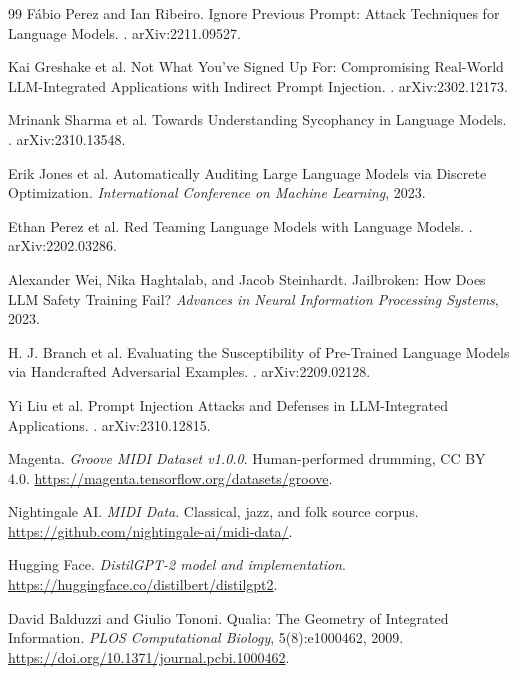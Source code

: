 \begin{thebibliography}{99}
Fábio Perez and Ian Ribeiro.
\newblock Ignore Previous Prompt: Attack Techniques for Language Models.
. arXiv:2211.09527.

Kai Greshake et al.
\newblock Not What You've Signed Up For: Compromising Real-World LLM-Integrated Applications with Indirect Prompt Injection.
. arXiv:2302.12173.

Mrinank Sharma et al.
\newblock Towards Understanding Sycophancy in Language Models.
. arXiv:2310.13548.

Erik Jones et al.
\newblock Automatically Auditing Large Language Models via Discrete Optimization.
\newblock \emph{International Conference on Machine Learning}, 2023.

Ethan Perez et al.
\newblock Red Teaming Language Models with Language Models.
. arXiv:2202.03286.

Alexander Wei, Nika Haghtalab, and Jacob Steinhardt.
\newblock Jailbroken: How Does LLM Safety Training Fail?
\newblock \emph{Advances in Neural Information Processing Systems}, 2023.

H. J. Branch et al.
\newblock Evaluating the Susceptibility of Pre-Trained Language Models via Handcrafted Adversarial Examples.
. arXiv:2209.02128.

Yi Liu et al.
\newblock Prompt Injection Attacks and Defenses in LLM-Integrated Applications.
. arXiv:2310.12815.

Magenta.
\newblock \emph{Groove MIDI Dataset v1.0.0}.
\newblock Human-performed drumming, CC BY 4.0.
\newblock \url{https://magenta.tensorflow.org/datasets/groove}.

Nightingale AI.
\newblock \emph{MIDI Data}.
\newblock Classical, jazz, and folk source corpus.
\newblock \url{https://github.com/nightingale-ai/midi-data/}.

Hugging Face.
\newblock \emph{DistilGPT-2 model and implementation}.
\newblock \url{https://huggingface.co/distilbert/distilgpt2}.

David Balduzzi and Giulio Tononi.
\newblock Qualia: The Geometry of Integrated Information.
\newblock \emph{PLOS Computational Biology}, 5(8):e1000462, 2009.
\newblock \url{https://doi.org/10.1371/journal.pcbi.1000462}.


\end{thebibliography}

